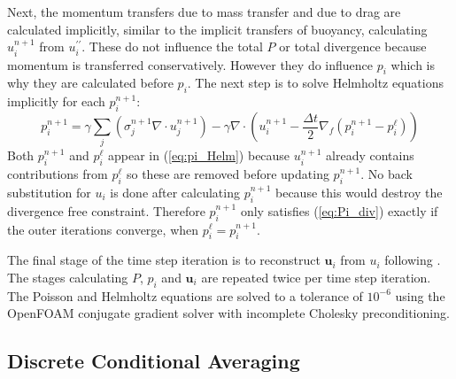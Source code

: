 \documentclass[draft]{agujournal2019}
\begin{document}
Next, the momentum transfers due to mass transfer and due to drag
are calculated implicitly, similar to the implicit transfers of buoyancy,
calculating $u_{i}^{n+1}$ from $u_{i}^{\prime\prime}$. These do
not influence the total $P$ or total divergence because momentum
is transferred conservatively. However they do influence $p_{i}$
which is why they are calculated before $p_{i}$. 
The next step
is to solve Helmholtz equations implicitly for each $p_{i}^{n+1}$:
\begin{equation}
p_{i}^{n+1} = \gamma \sum_j \left(\sigma^{n+1}_j \nabla\cdot u_j^{n+1} \right)
-\gamma\nabla\cdot
\left(u_{i}^{n+1}-\frac{\Delta t}{2}\nabla_{f}\left(p_{i}^{n+1}-p_{i}^{\ell}\right)\right)
\label{eq:pi_Helm}
\end{equation}
Both $p_{i}^{n+1}$ and $p_{i}^{\ell}$ appear in  (\ref{eq:pi_Helm})
because $u_{i}^{n+1}$ already contains contributions from $p_{i}^{\ell}$
so these are removed before updating $p_{i}^{n+1}$. No back substitution
for $u_{i}$ is done after calculating $p_{i}^{n+1}$ because this
would destroy the divergence free constraint. Therefore $p_{i}^{n+1}$
only satisfies  (\ref{eq:Pi_div}) exactly if the outer iterations
converge, when $p_{i}^{\ell}=p_{i}^{n+1}$. 

The final stage of the time step iteration is to reconstruct $\mathbf{u}_{i}$
from $u_{i}$ following . The stages calculating $P$,
$p_{i}$ and $\mathbf{u}_{i}$ are repeated twice per time step iteration.
The Poisson and Helmholtz equations are solved to a tolerance of $10^{-6}$
using the OpenFOAM conjugate gradient solver with incomplete Cholesky preconditioning.

\subsection{\label{sec:cAveraging}Discrete Conditional Averaging }
\end{document}
